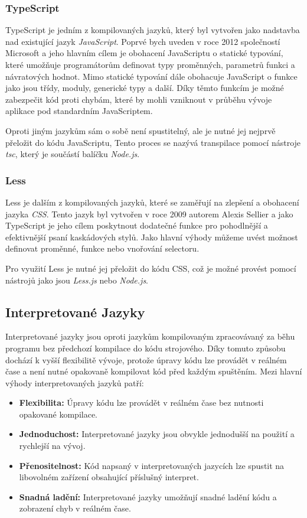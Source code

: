 \subsubsection{TypeScript}
\label{subsubsec:languages-compiled-typescript}
TypeScript je jedním z kompilovaných jazyků, který byl vytvořen jako nadstavba nad existující jazyk \textit{JavaScript}. Poprvé bych uveden v roce 2012 společností Microsoft a jeho hlavním cílem je obohacení JavaScriptu o statické typování, které umožňuje programátorům definovat typy proměnných, parametrů funkci a návratových hodnot. Mimo statické typování dále obohacuje JavaScript o funkce jako jsou třídy, moduly, generické typy a další. Díky těmto funkcím je možné zabezpečit kód proti chybám, které by mohli vzniknout v průběhu vývoje aplikace pod standardním JavaScriptem.

Oproti jiným jazykům sám o sobě není spustitelný, ale je nutné jej nejprvě přeložit do kódu JavaScriptu, Tento proces se nazývá transpilace pomocí nástroje \textit{tsc}, který je součástí balíčku \textit{Node.js}.

\subsubsection{Less}
\label{subsubsec:languages-compiled-less}
Less je dalším z kompilovaných jazyků, které se zaměřují na zlepšení a obohacení jazyka \textit{CSS}. Tento jazyk byl vytvořen v roce 2009 autorem Alexis Sellier a jako TypeScript je jeho cílem poskytnout dodatečné funkce pro pohodlnější a efektivnější psaní kaskádových stylů. Jako hlavní výhody můžeme uvést možnost definovat proměnné, funkce nebo vnořování selectoru.

Pro využití Less je nutné jej přeložit do kódu CSS, což je možné provést pomocí nástrojů jako jsou \textit{Less.js} nebo \textit{Node.js}.

\subsection{Interpretované Jazyky}
\label{subsec:languages-interpreted}
Interpretované jazyky jsou oproti jazykům kompilovaným zpracovávaný za běhu programu bez předchozí kompilace do kódu strojového. Díky tomuto způsobu dochází k vyšší flexibilitě vývoje, protože úpravy kódu lze provádět v reálném čase a není nutné opakovaně kompilovat kód před každým spuštěním. Mezi hlavní výhody interpretovaných jazyků patří:

\begin{itemize}
    \item \textbf{Flexibilita:} Úpravy kódu lze provádět v reálném čase bez nutnosti opakované kompilace.
    \item \textbf{Jednoduchost:} Interpretované jazyky jsou obvykle jednodušší na použití a rychlejší na vývoj.
    \item \textbf{Přenositelnost:} Kód napsaný v interpretovaných jazycích lze spustit na libovolném zařízení obsahující příslušný interpret.
    \item \textbf{Snadná ladění:} Interpretované jazyky umožňují snadné ladění kódu a zobrazení chyb v reálném čase.
\end{itemize}

